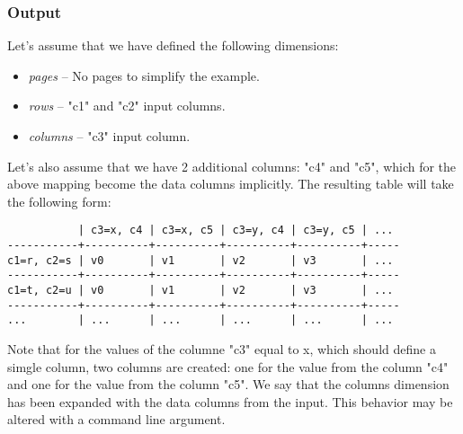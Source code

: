 \documentclass{report}
\begin{document}
\subsubsection{Output}
Let's assume that we have defined the following dimensions:
\begin{itemize}
	\item \textit{pages} -- No pages to simplify the example.
	\item \textit{rows} -- "c1" and "c2" input columns.
	\item \textit{columns} -- "c3" input column.
\end{itemize}

Let's also assume that we have 2 additional columns: "c4" and "c5", which for
the above mapping become the data columns implicitly. The resulting table will
take the following form:

\begin{verbatim}
           | c3=x, c4 | c3=x, c5 | c3=y, c4 | c3=y, c5 | ...
-----------+----------+----------+----------+----------+-----
c1=r, c2=s | v0       | v1       | v2       | v3       | ...
-----------+----------+----------+----------+----------+-----
c1=t, c2=u | v0       | v1       | v2       | v3       | ...
-----------+----------+----------+----------+----------+-----
...        | ...      | ...      | ...      | ...      | ...
\end{verbatim}

Note that for the values of the columne "c3" equal to x, which should define
a simgle column, two columns are created: one for the value from the column
"c4" and one for the value from the column "c5". We say that the columns
dimension has been expanded with the data columns from the input. This behavior
may be altered with a command line argument.
\end{document}
